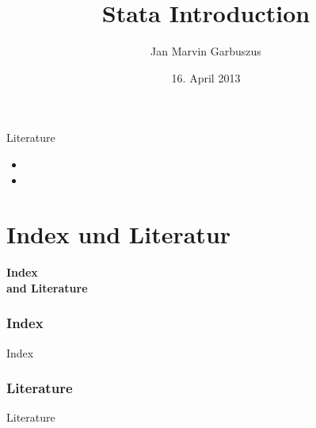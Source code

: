 \documentclass[hyperref={bookmarks=true}, aspectratio=43]{beamer}
\author[Garbuszus]{Jan Marvin Garbuszus}
\title{Stata Introduction}
\date{16. April 2013}
\institute{}
\begin{document}
\begin{frame}
  \maketitle
\end{frame}

\begin{frame}{Literature}
\begin{minipage}{11cm}

\begin{itemize}
\item {}
\item {}
\end{itemize}

\end{minipage}
\end{frame}








\part{Index und Literatur}
\begin{frame}
\thispagestyle{empty}
\textbf{\huge{Index \\ and Literature}}
\end{frame}

\section{Index}
\begin{frame}{Index}
\setlength{\columnseprule}{.4pt} 
\begin{multicols}{5}
 \begin{miniscule}
  \printindex
 \end{miniscule}
\end{multicols}
\end{frame}

\section{Literature}
\begin{frame}[allowframebreaks]{Literature}
 \printbibliography[title=none]
\end{frame}
\end{document}
